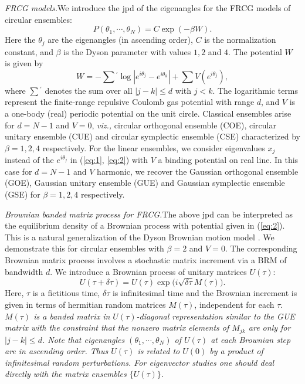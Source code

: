 \documentclass[reprint,amsmath,amssymb,showpacs,aps,]{revtex4-1}
\begin{document}
{\textit{FRCG models.}\textemdash We introduce the jpd of the eigenangles for the FRCG models of circular ensembles:
\begin{equation}\label{eq:1}
 P(\theta_1,\cdots,\theta_N) = C \exp(-\beta W).
\end{equation}
Here the $ \theta_{j}$ are the eigenangles (in ascending order), $C$ is the normalization constant, and $\beta$ is the Dyson parameter with values $1,2$ and $4$. The potential $W$ is given by 
\begin{equation}\label{eq:2}
W= -\sum {}^{'}\log|e^{i\theta_{j}}-e^{i\theta_{k}}|+ \sum V(e^{i\theta_{j}}),
\end{equation}
where $\sum{}^{'}$ denotes the sum over all $|j-k|\leq d$ with $j< k$. The logarithmic terms represent the finite-range repulsive Coulomb gas potential with range $d$, and $V$ is a one-body (real) periodic potential on the unit circle. Classical ensembles arise for $d=N-1$ and $V=0$, \textit{viz.,} circular orthogonal ensemble (COE), circular unitary ensemble (CUE) and circular symplectic ensemble (CSE) characterized by $\beta=1,2,4$ respectively. For the linear ensembles, we consider eigenvalues $ x_{j}$ instead of the $e^{i\theta_{j}}$ in (\ref{eq:1}, \ref{eq:2}) with $V$ a binding potential on real line. In this case for $d=N-1$ and $V$ harmonic, we recover the Gaussian orthogonal ensemble (GOE), Gaussian unitary ensemble (GUE) and Gaussian symplectic ensemble (GSE) for $\beta=1,2,4$ respectively.\par
\textit{Brownian banded matrix process for FRCG.}\textemdash The above jpd can be interpreted as the equilibrium density of a Brownian process with potential given in (\ref{eq:2}). This is a natural generalization of the Dyson Brownian motion model \cite{FDY,FDY1}. We demonstrate this for circular ensembles with $\beta=2$ and $V=0$. The corresponding Brownian matrix process involves a stochastic matrix increment via a BRM of bandwidth $d$. We introduce a Brownian process of unitary matrices $U(\tau)$:
\begin{equation}\label{eq:3}
U(\tau+\delta\tau)= U(\tau)\exp{\big(i\sqrt{\delta\tau} M(\tau)\big)}.
\end{equation}
Here, $\tau$ is a fictitious time, $\delta\tau$ is infinitesimal time and the Brownian increment is given in terms of hermitian random matrices $M(\tau)$, independent for each $\tau$. \textit{$M(\tau)$ is a banded matrix in $U(\tau)$-diagonal representation similar to the GUE matrix with the constraint that the nonzero matrix elements of $M_{jk}$ are only for $|j-k|\leq d$. Note that eigenangles $(\theta_{1},\cdots,\theta_{N})$ of $U(\tau)$ at each Brownian step are in ascending order. Thus $U(\tau)$ is related to $U(0)$ by a product of infinitesimal random perturbations. For eigenvector studies one should deal directly with the matrix ensembles $\lbrace U(\tau) \rbrace$.} \par
}
\end{document}
